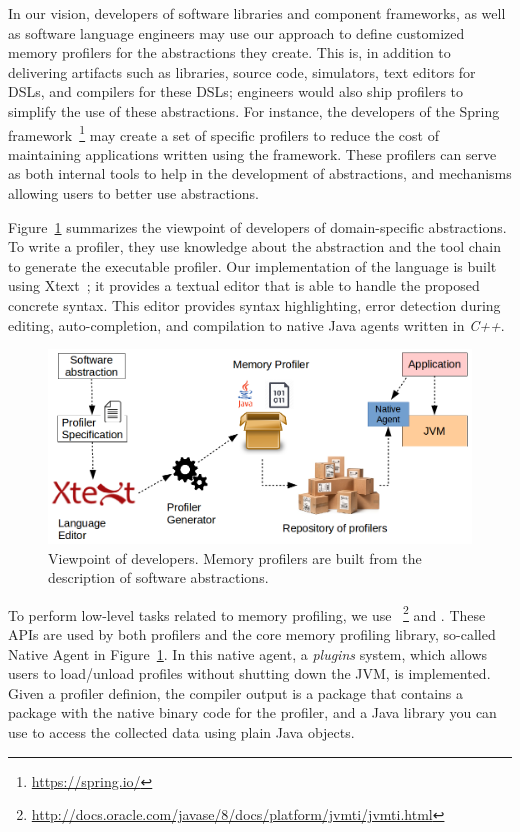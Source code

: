 
In our vision, developers of software libraries and component frameworks, as well as software language engineers may use our approach to  define customized memory profilers for the abstractions they create.
This is, in addition to delivering artifacts such as libraries, source code, simulators, text editors for DSLs, and compilers for these DSLs; engineers would also ship profilers to simplify the use of these abstractions.
For instance, the developers of the Spring framework~\footnote{\url{https://spring.io/}} may create a set of specific profilers to reduce the cost of maintaining applications written using the framework.
These profilers can serve as both internal tools to help in the development of abstractions, and mechanisms allowing users to better use abstractions.

Figure~\ref{fig:dsl-tooling-developer} summarizes the viewpoint of developers of domain-specific abstractions.
To write a profiler, they use knowledge about the abstraction and the tool chain to generate the executable profiler. 
Our implementation of the language is built using Xtext~\cite{Eysholdt:2010:XIY:1869542.1869625}; it provides a textual editor that is able to handle the proposed concrete syntax.
This editor provides syntax highlighting, error detection during editing, auto-completion, and compilation to native Java agents written in \textit{C++}.

\begin{figure}
\centering
\includegraphics[scale=0.45]{./chapter6/fig/developer-profiler-view.png}
\caption{Viewpoint of developers. Memory profilers are built from the description of software abstractions.}\label{fig:dsl-tooling-developer}
\end{figure}

To perform low-level tasks related to memory profiling, we use ~\footnote{\url{http://docs.oracle.com/javase/8/docs/platform/jvmti/jvmti.html}} and .
These APIs are used by both profilers and the core memory profiling library, so-called Native Agent in Figure~\ref{fig:dsl-tooling-developer}.
In this native agent, a \textit{plugins} system, which allows users to load/unload profiles without shutting down the JVM, is implemented.
Given a profiler definion, the compiler output is a package that contains a package with the native binary code for the profiler, and a Java library you can use to access the collected data using plain Java objects.

